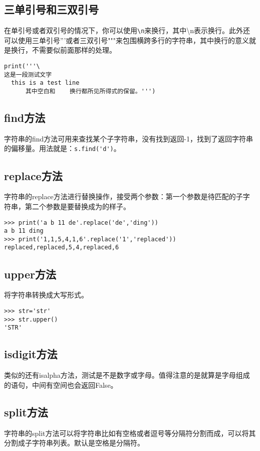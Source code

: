 \documentclass[12pt,oneside]{book}
\begin{document}
\begin{common-format}
\subsection{三单引号和三双引号}
在单引号或者双引号的情况下，你可以使用\verb+\n+来换行，其中\textbackslash n表示换行。此外还可以使用三单引号'''或者三双引号"""来包围横跨多行的字符串，其中换行的意义就是换行，不需要似前面那样的处理。

\begin{Verbatim}
print('''\
这是一段测试文字
  this is a test line
      其中空白和    换行都所见所得式的保留。''')
\end{Verbatim}

\subsection{find方法}
字符串的find方法可用来查找某个子字符串，没有找到返回-1，找到了返回字符串的偏移量。用法就是：\verb+s.find('d')+。


\subsection{replace方法}
字符串的replace方法进行替换操作，接受两个参数：第一个参数是待匹配的子字符串，第二个参数是要替换成为的样子。
\begin{Verbatim}
>>> print('a b 11 de'.replace('de','ding'))
a b 11 ding
>>> print('1,1,5,4,1,6'.replace('1','replaced'))
replaced,replaced,5,4,replaced,6
\end{Verbatim}




\subsection{upper方法}
将字符串转换成大写形式。
\begin{Verbatim}
>>> str='str'
>>> str.upper()
'STR'
\end{Verbatim}


\subsection{isdigit方法}
类似的还有isalpha方法，测试是不是数字或字母。值得注意的是就算是字母组成的语句，中间有空间也会返回False。

\subsection{split方法}
字符串的split方法可以将字符串比如有空格或者逗号等分隔符分割而成，可以将其分割成子字符串列表。默认是空格是分隔符。


\end{common-format}
\end{document}

